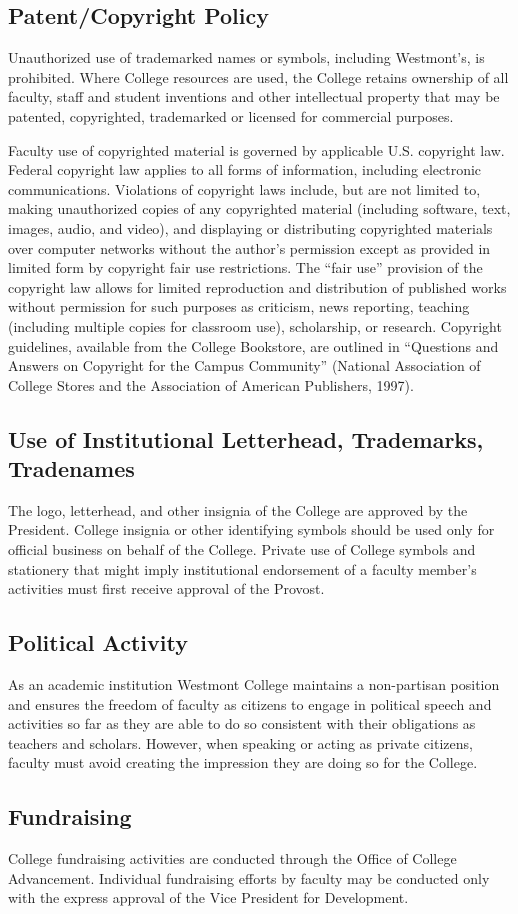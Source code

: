 	\subsection{Patent/Copyright Policy}

		Unauthorized use of trademarked names or symbols, including Westmont's, is
		prohibited.  Where College resources are used, the College retains ownership
		of all faculty, staff and student inventions and other intellectual property
		that may be patented, copyrighted, trademarked or licensed for commercial
		purposes.

		Faculty use of copyrighted material is governed by applicable U.S.
		copyright law.  Federal copyright law applies to all forms of
		information, including electronic communications.  Violations of
		copyright laws include, but are not limited to, making unauthorized
		copies of any copyrighted material (including software, text, images,
		audio, and video), and displaying or distributing copyrighted materials
		over computer networks without the author's permission except as
		provided in limited form by copyright fair use restrictions.  The ``fair
		use'' provision of the copyright law allows for limited reproduction and
		distribution of published works without permission for such purposes as
		criticism, news reporting, teaching (including multiple copies for
		classroom use), scholarship, or research.  Copyright guidelines,
		available from the College Bookstore, are outlined in ``Questions and
		Answers on Copyright for the Campus Community'' (National Association of
		College Stores and the Association of American Publishers, 1997).

	\subsection{Use of Institutional Letterhead, Trademarks, Tradenames}
		The logo, letterhead, and other insignia of the College are approved by the President.  College insignia or other identifying symbols should be used only for official business on behalf of the College.  Private use of College symbols and stationery that might imply institutional endorsement of a faculty member's activities must first receive approval of the Provost.
	\subsection{Political Activity}
		As an academic institution Westmont College maintains a non-partisan position and ensures the freedom of faculty as citizens to engage in political speech and activities so far as they are able to do so consistent with their obligations as teachers and scholars.  However, when speaking or acting as private citizens, faculty must avoid creating the impression they are doing so for the College.
	\subsection{Fundraising}
		College fundraising activities are conducted through the Office of College Advancement.  Individual fundraising efforts by faculty may be conducted only with the express approval of the Vice President for Development.